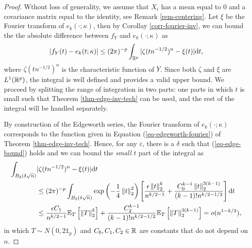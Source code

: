 \begin{proof}
    Wthout loss of generality, we assume that $X_i$ has a mean equal to 0 and a covariance matrix equal to the identity, see Remark \ref{rem-centering}. Let $\xi$ be the Fourier transform of $e_k(\cdot; \kappa)$, then by Corollay \ref{corr-fourier-inv}, we can bound the the absolute difference between $f_Y$ and $e_k(\cdot; \kappa)$ as
    \begin{equation*}
        |f_Y(t) - e_k(t; \kappa)| \leq (2\pi)^{-p}\intRp{t}{|\zeta(tn^{-1/2})^n - \xi(t)|},
    \end{equation*}
    where $\zeta(tn^{-1/2})^n$ is the characteristic function of $Y$. Since both $\zeta$ and $\xi$ are $L^1(\Rp)$, the integral is well defined and provides a valid upper bound. We proceed by splitting the range of integration in two parts: one parts in which $t$ is small such that Theorem \ref{thm-edge-inv-tech} can be used, and the rest of the integral will be handled separately.

    By construction of the Edgeworth series, the Fourier transform of $e_k(\cdot; \kappa)$ corresponds to the function given in Equation (\ref{eq-edgeworth-fourier}) of Theorem \ref{thm-edge-inv-tech}. Hence, for any $\varepsilon$, there is a $\delta$ such that (\ref{eq-edge-bound}) holds and we can bound the \textit{small $t$} part of the integral as
    \begin{align*}
        \int_{B_2(\delta\sqrt{n})} &|\zeta(tn^{-1/2})^n - \xi(t)| \d t\\
        &\leq (2\pi)^{-p}\int_{B_2(\delta\sqrt{n})}\expf{-\frac{1}{4}\norm{t}_2^2}\left[ \frac{\epsilon\norm{t}_2^k}{n^{k/2-1}} + \frac{C_0^{k-1}\norm{t}_2^{3(k-1)}}{(k-1)!n^{k/2-1/2}} \right] \d t \\
        &\leq \frac{\epsilon C_1}{n^{k/2-1}}\expec{T}{\norm{T}^k_2} + \frac{C_2^{k-1}}{(k-1)!n^{k/2-1/2}}\expec{T}{\norm{T}_2^{3(k-1)}}
        = o(n^{1-k/2}),
    \end{align*}
    in which $T \sim N(0, 2\mathbb{1}_p)$ and $C_0, C_1, C_2 \in \R$ are constants that do not depend on $n$. 


\end{proof}
